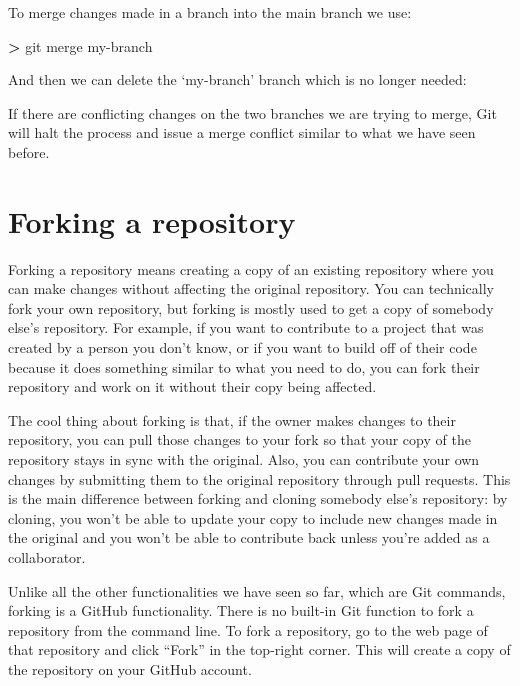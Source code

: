 \documentclass[
]{book}
\newenvironment{Shaded}{\begin{snugshade}}{\end{snugshade}}
\newcommand{\FunctionTok}[1]{\textcolor[rgb]{0.00,0.00,0.00}{#1}}
\newcommand{\NormalTok}[1]{#1}
\newcommand{\OperatorTok}[1]{\textcolor[rgb]{0.81,0.36,0.00}{\textbf{#1}}}
\begin{document}
To merge changes made in a branch into the main branch we use:

\begin{Shaded}
\begin{Highlighting}[]
\OperatorTok{>} \FunctionTok{git}\NormalTok{ merge my-branch}
\end{Highlighting}
\end{Shaded}

And then we can delete the `my-branch' branch which is no longer needed:

\begin{Shaded}
\end{Shaded}

If there are conflicting changes on the two branches we are trying to merge, Git will halt the process and issue a merge conflict similar to what we have seen before.

\hypertarget{forking-a-repository}{%
\section{Forking a repository}\label{forking-a-repository}}

Forking a repository means creating a copy of an existing repository where you can make changes without affecting the original repository. You can technically fork your own repository, but forking is mostly used to get a copy of somebody else's repository. For example, if you want to contribute to a project that was created by a person you don't know, or if you want to build off of their code because it does something similar to what you need to do, you can fork their repository and work on it without their copy being affected.

The cool thing about forking is that, if the owner makes changes to their repository, you can pull those changes to your fork so that your copy of the repository stays in sync with the original. Also, you can contribute your own changes by submitting them to the original repository through pull requests. This is the main difference between forking and cloning somebody else's repository: by cloning, you won't be able to update your copy to include new changes made in the original and you won't be able to contribute back unless you're added as a collaborator.

Unlike all the other functionalities we have seen so far, which are Git commands, forking is a GitHub functionality. There is no built-in Git function to fork a repository from the command line. To fork a repository, go to the web page of that repository and click ``Fork'' in the top-right corner. This will create a copy of the repository on your GitHub account.
\end{document}
